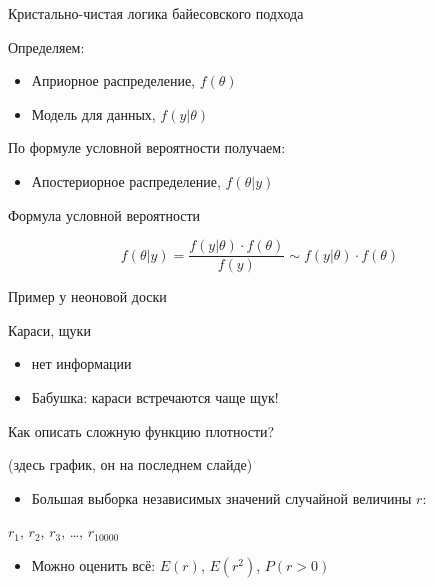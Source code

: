 \documentclass[ignorenonframetext,]{beamer}
\begin{document}
\begin{frame}{Кристально-чистая логика байесовского подхода}

Определяем:

\begin{itemize}
\item
  Априорное распределение, \(f(\theta)\)
\item
  Модель для данных, \(f(y|\theta)\)
\end{itemize}

По формуле условной вероятности получаем:

\begin{itemize}
\itemsep1pt\parskip0pt
\item
  Апостериорное распределение, \(f(\theta|y)\)
\end{itemize}

\end{frame}

\begin{frame}{Формула условной вероятности}

\[
f(\theta|y)= \frac{f(y|\theta)\cdot f(\theta)}{f(y)} \sim f(y|\theta)\cdot f(\theta)
\]

\end{frame}

\begin{frame}{Пример у неоновой доски}

Караси, щуки

\begin{itemize}
\item
  нет информации
\item
  Бабушка: караси встречаются чаще щук!
\end{itemize}

\end{frame}

\begin{frame}{Как описать сложную функцию плотности?}

(здесь график, он на последнем слайде)

\begin{itemize}
\itemsep1pt\parskip0pt
\item
  Большая выборка независимых значений случайной величины \(r\):
\end{itemize}

\(r_1\), \(r_2\), \(r_3\), \ldots, \(r_{10000}\)

\begin{itemize}
\itemsep1pt\parskip0pt
\item
  Можно оценить всё: \(E(r)\), \(E(r^2)\), \(P(r>0)\)
\end{itemize}

\end{frame}
\end{document}
